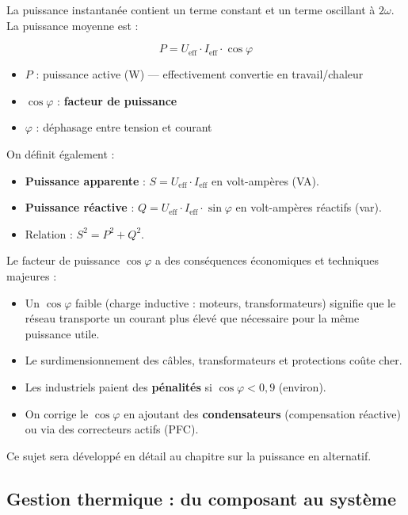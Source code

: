 \documentclass[12pt,a4paper,twoside]{book}
\begin{document}
La puissance instantanée contient un terme constant et un terme oscillant à $2\omega$. La puissance moyenne est :

\begin{formule}
\[
\boxed{P = U_{\text{eff}} \cdot I_{\text{eff}} \cdot \cos\varphi}
\]
\begin{itemize}[nosep]
\item $P$ : puissance active (W) — effectivement convertie en travail/chaleur
\item $\cos\varphi$ : \textbf{facteur de puissance}
\item $\varphi$ : déphasage entre tension et courant
\end{itemize}
\end{formule}

On définit également :
\begin{itemize}[nosep]
\item \textbf{Puissance apparente} : $S = U_{\text{eff}} \cdot I_{\text{eff}}$ en volt-ampères (VA).
\item \textbf{Puissance réactive} : $Q = U_{\text{eff}} \cdot I_{\text{eff}} \cdot \sin\varphi$ en volt-ampères réactifs (var).
\item Relation : $S^2 = P^2 + Q^2$.
\end{itemize}

\begin{attention}
Le facteur de puissance $\cos\varphi$ a des conséquences économiques et techniques majeures :
\begin{itemize}[nosep]
\item Un $\cos\varphi$ faible (charge inductive : moteurs, transformateurs) signifie que le réseau transporte un courant plus élevé que nécessaire pour la même puissance utile.
\item Le surdimensionnement des câbles, transformateurs et protections coûte cher.
\item Les industriels paient des \textbf{pénalités} si $\cos\varphi < 0{,}9$ (environ).
\item On corrige le $\cos\varphi$ en ajoutant des \textbf{condensateurs} (compensation réactive) ou via des correcteurs actifs (PFC).
\end{itemize}
Ce sujet sera développé en détail au chapitre sur la puissance en alternatif.
\end{attention}

\subsection{Gestion thermique : du composant au système}
\end{document}
